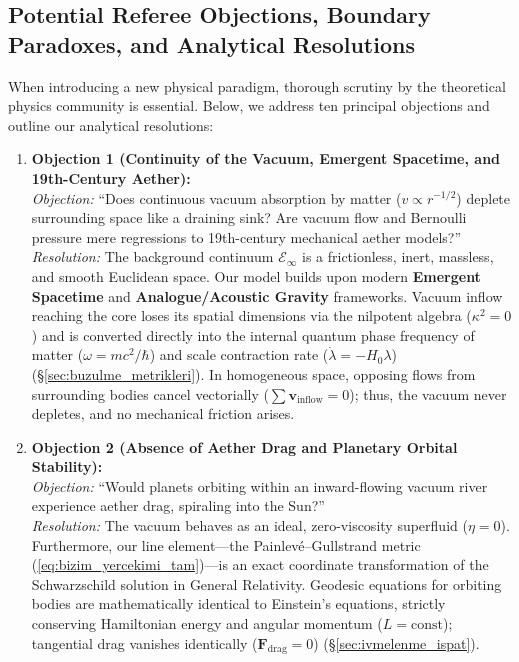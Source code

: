 \subsection{Potential Referee Objections, Boundary Paradoxes, and Analytical Resolutions}
\label{sec:hakem_itirazlari}

When introducing a new physical paradigm, thorough scrutiny by the theoretical physics community is essential. Below, we address ten principal objections and outline our analytical resolutions:

\begin{enumerate}
    \item \textbf{Objection 1 (Continuity of the Vacuum, Emergent Spacetime, and 19th-Century Aether):} \\
          \textit{Objection:} ``Does continuous vacuum absorption by matter ($v \propto r^{-1/2}$) deplete surrounding space like a draining sink? Are vacuum flow and Bernoulli pressure mere regressions to 19th-century mechanical aether models?'' \\
          \textit{Resolution:} The background continuum $\mathcal{E}_\infty$ is a frictionless, inert, massless, and smooth Euclidean space. Our model builds upon modern \textbf{Emergent Spacetime} and \textbf{Analogue/Acoustic Gravity} frameworks. Vacuum inflow reaching the core loses its spatial dimensions via the nilpotent algebra ($\kappa^2 = 0$) and is converted directly into the internal quantum phase frequency of matter ($\omega = mc^2/\hbar$) and scale contraction rate ($\dot{\lambda} = -H_0 \lambda$) (\S\ref{sec:buzulme_metrikleri}). In homogeneous space, opposing flows from surrounding bodies cancel vectorially ($\sum \mathbf{v}_{\mathrm{inflow}} = 0$); thus, the vacuum never depletes, and no mechanical friction arises.

    \item \textbf{Objection 2 (Absence of Aether Drag and Planetary Orbital Stability):} \\
          \textit{Objection:} ``Would planets orbiting within an inward-flowing vacuum river experience aether drag, spiraling into the Sun?'' \\
          \textit{Resolution:} The vacuum behaves as an ideal, zero-viscosity superfluid ($\eta = 0$). Furthermore, our line element—the Painlev\'e--Gullstrand metric (\ref{eq:bizim_yercekimi_tam})—is an exact coordinate transformation of the Schwarzschild solution in General Relativity. Geodesic equations for orbiting bodies are mathematically identical to Einstein's equations, strictly conserving Hamiltonian energy and angular momentum ($L = \text{const}$); tangential drag vanishes identically ($\mathbf{F}_{\mathrm{drag}} = 0$) (\S\ref{sec:ivmelenme_ispat}).


\end{enumerate}
